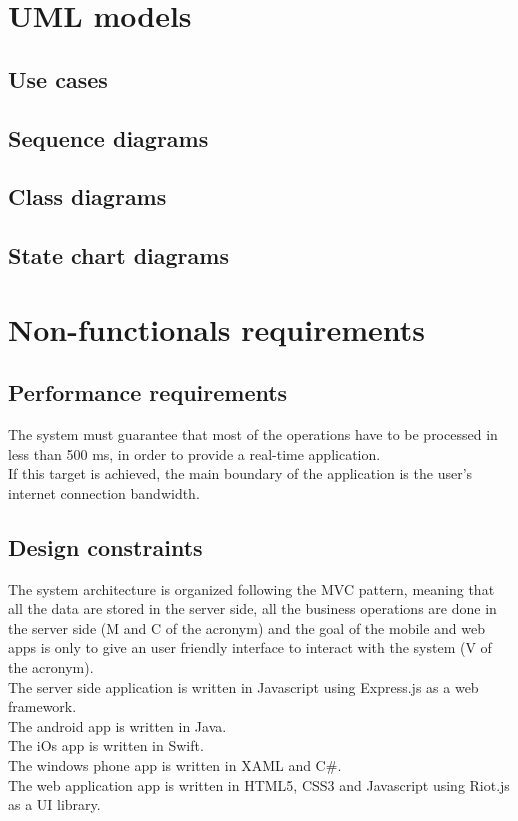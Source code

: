 \section{UML models}

\subsection{Use cases}

\subsection{Sequence diagrams}

\subsection{Class diagrams}

\subsection{State chart diagrams}

\section{Non-functionals requirements}

\subsection{Performance requirements}
The system must guarantee that most of the operations have to be processed in less than 500 ms, in order to provide a real-time application.\\
If this target is achieved, the main boundary of the application is the user’s internet connection bandwidth.

\subsection{Design constraints}
The system architecture is organized following the MVC pattern, meaning that all the data are stored in the server side, all the business operations are done in the server side (M and C of the acronym) and the goal of the mobile and web apps is only to give an user friendly interface to interact with the system (V of the acronym).\\
The server side application is written in Javascript using Express.js as a web framework.\\
The android app is written in Java.\\
The iOs app is written in Swift.\\
The windows phone app is written in XAML and C\#.\\
The web application app is written in HTML5, CSS3 and Javascript using Riot.js as a UI library.


